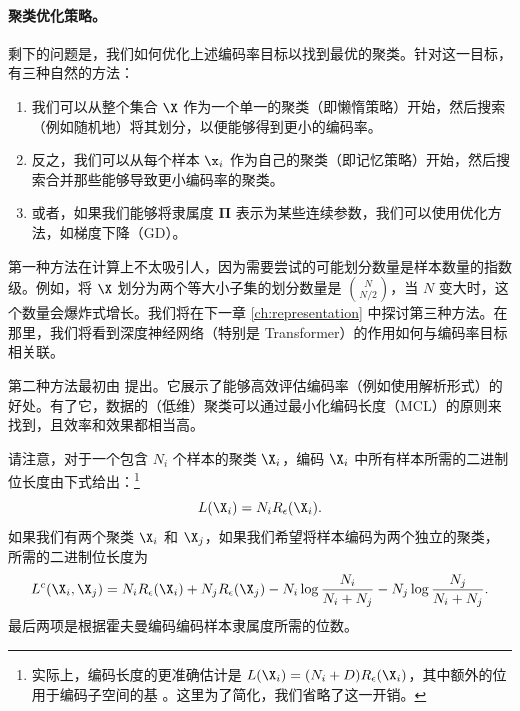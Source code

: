 \documentclass[../../book-main.tex]{subfiles}
\begin{document}
\paragraph{聚类优化策略。}
剩下的问题是，我们如何优化上述编码率目标以找到最优的聚类。针对这一目标，有三种自然的方法：
\begin{enumerate}
    \item 我们可以从整个集合 $\X$ 作为一个单一的聚类（即懒惰策略）开始，然后搜索（例如随机地）将其划分，以便能够得到更小的编码率。
    \item 反之，我们可以从每个样本 $\x_i$ 作为自己的聚类（即记忆策略）开始，然后搜索合并那些能够导致更小编码率的聚类。
    \item 或者，如果我们能够将隶属度 $\boldsymbol{\Pi}$ 表示为某些连续参数，我们可以使用优化方法，如梯度下降（GD）。
\end{enumerate}
第一种方法在计算上不太吸引人，因为需要尝试的可能划分数量是样本数量的指数级。例如，将 $\X$ 划分为两个等大小子集的划分数量是 $N \choose N/2$，当 $N$ 变大时，这个数量会爆炸式增长。我们将在下一章 \ref{ch:representation} 中探讨第三种方法。在那里，我们将看到深度神经网络（特别是 Transformer）的作用如何与编码率目标相关联。

第二种方法最初由 \cite{ma2007segmentation} 提出。它展示了能够高效评估编码率（例如使用解析形式）的好处。有了它，数据的（低维）聚类可以通过最小化编码长度（MCL）的原则来找到，且效率和效果都相当高。

请注意，对于一个包含 $N_i$ 个样本的聚类 $\X_i$，编码 $\X_i$ 中所有样本所需的二进制位长度由下式给出：\footnote{实际上，编码长度的更准确估计是 $L(\X_i) = (N_i+D) R_\epsilon(\X_i)$，其中额外的位用于编码子空间的基 \cite{ma2007segmentation}。这里为了简化，我们省略了这一开销。}
\begin{equation}
    L(\X_i) = N_i R_\epsilon(\X_i). 
\end{equation}
如果我们有两个聚类 $\X_i$ 和 $\X_j$，如果我们希望将样本编码为两个独立的聚类，所需的二进制位长度为
\begin{equation*}
    L^c(\X_i, \X_j) = N_i R_\epsilon(\X_i) + N_j R_\epsilon(\X_j) - N_i \log\frac{N_i}{N_i+N_j} - N_j \log\frac{N_j}{N_i+N_j}. 
\end{equation*}
最后两项是根据霍夫曼编码编码样本隶属度所需的位数。
\end{document}
